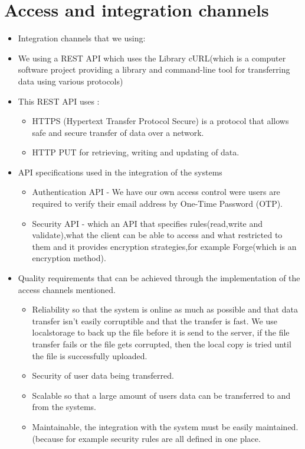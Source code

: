 \documentclass[a4paper,12pt]{article}
\begin{document}
\section{Access and integration channels}
\begin{itemize}
\item Integration channels that we using:
\item We using a REST API which uses the Library cURL(which is a computer software project providing a library and command-line tool for transferring data using various protocols)

\item This REST API uses : 
\begin{itemize}
\item HTTPS (Hypertext Transfer Protocol Secure) is a protocol that allows safe and secure transfer of data over a network.
\item HTTP PUT for retrieving, writing and updating of data.
\end{itemize}

\item API specifications used in the integration of the systems
\begin{itemize}
\item Authentication API - We have our own access control were users are required to verify their email address by One-Time Password (OTP).
\item Security API - which an API that specifies rules(read,write and validate),what the client can be able to access and what restricted to them and it provides encryption strategies,for example Forge(which is an encryption method).
\end{itemize}

\item Quality requirements that can be achieved through the implementation of the access channels mentioned.
\begin{itemize}
\item Reliability so that the system is online as much as possible and that data transfer isn’t easily corruptible and that the transfer is fast. We use localstorage to back up the file before it is send to the server, if the file transfer fails or the file gets corrupted, then the local copy is tried until the file is successfully uploaded.

\item Security of user data being transferred.

\item Scalable so that a large amount of users data can be transferred to and from the systems.

\item Maintainable, the integration with the system must be easily maintained. (because for example security rules are all defined in one place.
\end{itemize}
\end{itemize}
\end{document}
